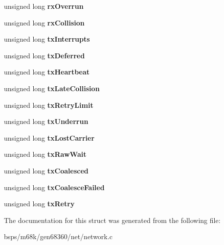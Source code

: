 \begin{DoxyCompactItemize}
unsigned long {\bfseries rx\+Overrun}
\item 
\mbox{\label{structscc__softc_a92891d192b41c12a0d62eabd338ccced}} 
unsigned long {\bfseries rx\+Collision}
\item 
\mbox{\label{structscc__softc_a4322991cefddda5105cbf5cdf0e34d25}} 
unsigned long {\bfseries tx\+Interrupts}
\item 
\mbox{\label{structscc__softc_af15b4e7a1e1927f4bc4e61776a0b2b63}} 
unsigned long {\bfseries tx\+Deferred}
\item 
\mbox{\label{structscc__softc_a47dc0bb249e410654700e68e7f7f62f0}} 
unsigned long {\bfseries tx\+Heartbeat}
\item 
\mbox{\label{structscc__softc_ab499dca31387cf4643dea72eb4ab8bfd}} 
unsigned long {\bfseries tx\+Late\+Collision}
\item 
\mbox{\label{structscc__softc_a3598bc8475c5ebf82b924309781f6a2c}} 
unsigned long {\bfseries tx\+Retry\+Limit}
\item 
\mbox{\label{structscc__softc_a4ccca31ca97e99bfabbe3a98be841659}} 
unsigned long {\bfseries tx\+Underrun}
\item 
\mbox{\label{structscc__softc_a5d56e78c5593608ef33a4f78ad4d4617}} 
unsigned long {\bfseries tx\+Lost\+Carrier}
\item 
\mbox{\label{structscc__softc_ac5527a306ee04d61634f6c258c340875}} 
unsigned long {\bfseries tx\+Raw\+Wait}
\item 
\mbox{\label{structscc__softc_ae238ec925878053e1c1d6489943fb38c}} 
unsigned long {\bfseries tx\+Coalesced}
\item 
\mbox{\label{structscc__softc_aa78bc5d6ebd4469374df4315189ee687}} 
unsigned long {\bfseries tx\+Coalesce\+Failed}
\item 
\mbox{\label{structscc__softc_ae73b7ee4185923a1eca19bde60fdb3dd}} 
unsigned long {\bfseries tx\+Retry}
\end{DoxyCompactItemize}


The documentation for this struct was generated from the following file\+:\begin{DoxyCompactItemize}
\item 
bsps/m68k/gen68360/net/network.\+c\end{DoxyCompactItemize}
